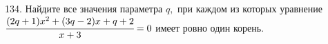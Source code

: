 134. Найдите все значения параметра $q,$ при каждом из которых уравнение\\ $\cfrac{(2q+1)x^2+(3q-2)x+q+2}{x+3}=0$ имеет ровно один корень.\\
